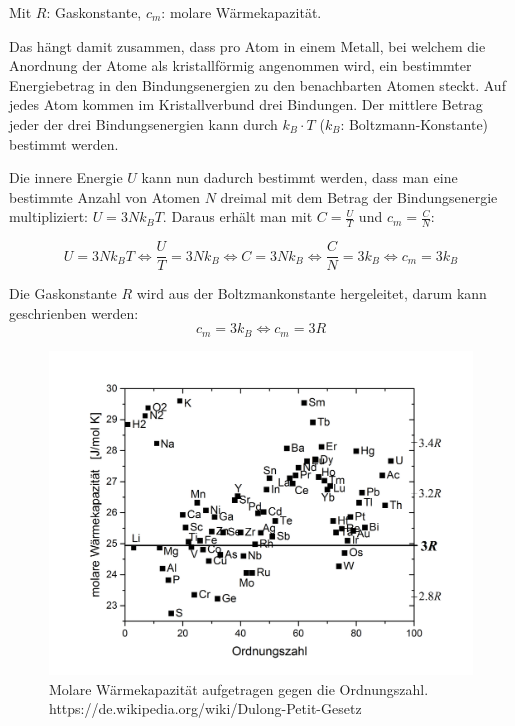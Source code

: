 \documentclass[a4paper, 12pt]{article}
\begin{document}
Mit $R$: Gaskonstante, $c_m$: molare Wärmekapazität. 

\noindent Das hängt damit zusammen, dass pro Atom in einem Metall, bei welchem die Anordnung der Atome als kristallförmig angenommen wird, ein bestimmter Energiebetrag in den Bindungsenergien zu den benachbarten Atomen steckt. Auf jedes Atom kommen im Kristallverbund drei Bindungen. Der mittlere Betrag jeder der drei Bindungsenergien kann durch $k_B\cdot T$ ($k_B$: Boltzmann-Konstante) bestimmt werden.

Die innere Energie $U$ kann nun dadurch bestimmt werden, dass man eine bestimmte Anzahl von Atomen $N$ dreimal mit dem Betrag der Bindungsenergie multipliziert: $U=3Nk_BT$.
Daraus erhält man mit $C=\frac{U}{T}$ und $c_m=\frac{C}{N}$:

$$U=3Nk_BT \Leftrightarrow \frac{U}{T}=3Nk_B \Leftrightarrow C=3Nk_B \Leftrightarrow \frac{C}{N}=3k_B \Leftrightarrow c_m=3k_B$$

Die Gaskonstante $R$ wird aus der Boltzmankonstante hergeleitet, darum kann geschrienben werden:
$$c_m=3k_B \Leftrightarrow c_m=3R$$

\begin{figure}[h]
\centering
\includegraphics[width=\textwidth]{DP.png}
\caption{Molare Wärmekapazität aufgetragen gegen die Ordnungszahl. https://de.wikipedia.org/wiki/Dulong-Petit-Gesetz}
\end{figure}
\end{document}
